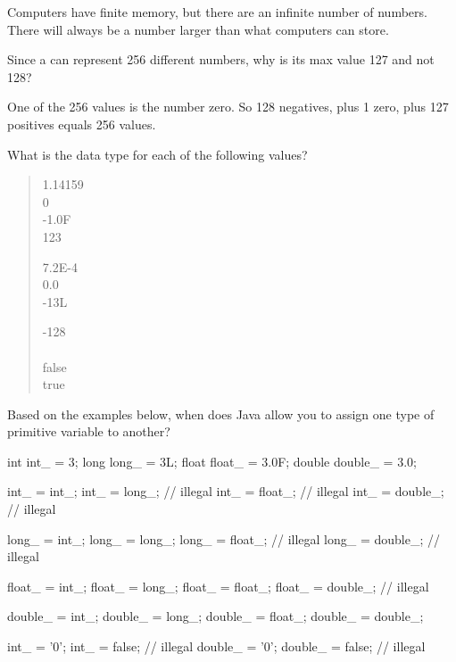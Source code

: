 \begin{answer}
Computers have finite memory, but there are an infinite number of numbers.
There will always be a number larger than what computers can store.
\end{answer}


\Q Since a  can represent 256 different numbers, why is its max value 127 and not 128?

\begin{answer}
One of the 256 values is the number zero. So 128 negatives, plus 1 zero, plus 127 positives equals 256 values.
\end{answer}


\newpage

\Q \label{literals}
What is the data type for each of the following values?

\begin{quote}
\begin{multicols}{3}
1.14159      \\[1ex]
0               \\[1ex]
-1.0F         \\[1ex]
123        

7.2E-4       \\[1ex]
0.0          \\[1ex]
-13L           \\[1ex]
\qs  {}

-128            \\[1ex]
\qs  {}    \\[1ex]
false       \\[1ex]
true       
\end{multicols}
\end{quote}


\Q \label{allowed}
Based on the examples below, when does Java allow you to assign one type of primitive variable to another?

\begin{multicols}{2}
\begin{javalst}
    int int_ = 3;
    long long_ = 3L;
    float float_ = 3.0F;
    double double_ = 3.0;
    
    int_ = int_;
    int_ = long_;      // illegal
    int_ = float_;     // illegal
    int_ = double_;    // illegal
    
    long_ = int_;
    long_ = long_;
    long_ = float_;    // illegal
    long_ = double_;   // illegal

    float_ = int_;
    float_ = long_;
    float_ = float_;
    float_ = double_;  // illegal
    
    double_ = int_;
    double_ = long_;
    double_ = float_;
    double_ = double_;
    
    int_ = '0';
    int_ = false;      // illegal
    double_ = '0';
    double_ = false;   // illegal
\end{javalst}
\end{multicols}

